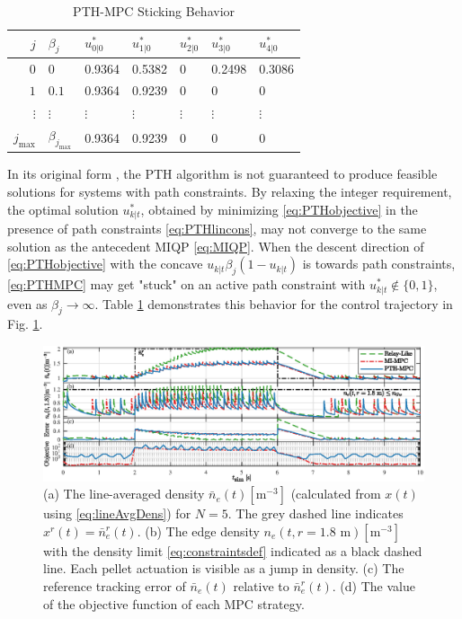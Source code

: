 \documentclass[journal,twoside,web]{ieeecolor}
\begin{document}
\begin{table}[b!]
\caption{PTH-MPC Sticking Behavior}
\centering
\begin{tabular}{rllllll}
\toprule[1pt]
$ j $ & $\beta_j$  & $u^*_{0|0}$ & $u^*_{1|0}$ & $u^*_{2|0}$ & $u^*_{3|0}$ & $u^*_{4|0}$ \\  \midrule
 0 & 0 & 0.9364 & 0.5382 & 0 & 0.2498 & 0.3086 \\
 $1$ & $0.1$ & 0.9364 & 0.9239 & 0 & 0 & 0 \\
 $\vdots$ & $\vdots$ & $\vdots$ & $\vdots$ & $\vdots$ &  $\vdots$ & $\vdots$ \\
 $j_{\textrm{max}}$ & $\beta_{j_\textrm{max}}$ & 0.9364 & 0.9239 & 0 & 0 & 0 \\
\bottomrule
\end{tabular}
\label{tab:sticky}
\end{table}

In its original form \cite{Sager2006}, the PTH algorithm is not guaranteed to produce feasible solutions for systems with path constraints. By relaxing the integer requirement, the optimal solution $u^*_{k|t}$, obtained by minimizing \eqref{eq:PTHobjective} in the presence of path constraints \eqref{eq:PTHlincons}, may not converge to the same solution as the antecedent MIQP \eqref{eq:MIQP}. When the descent direction of \eqref{eq:PTHobjective} with the concave $u_{k|t}\beta_j(1-u_{k|t})$ is towards path constraints, \eqref{eq:PTHMPC} may get "stuck" on an active path constraint with $u^*_{k|t} \notin \{0,1\}$, even as $\beta_j\rightarrow \infty$. Table \ref{tab:sticky} demonstrates this behavior for the control trajectory in Fig. \ref{fig:ctrlTrajectory}.

\begin{figure}[t!]
\centering
\parbox{\textwidth}{\includegraphics[width=\textwidth]{orric3.eps}}
\caption{(a) The line-averaged density $\bar{n}_e(t)[\textrm{m}^{-3}]$ (calculated from $x(t)$ using \eqref{eq:lineAvgDens}) for $N=5$. The grey dashed line indicates $x^r(t) = \bar{n}_e^r(t)$. (b) The edge density $n_e(t, r=1.8\textrm{ m})[\textrm{m}^{-3}]$ with the density limit \eqref{eq:constraintsdef} indicated as a black dashed line. Each pellet actuation is visible as a jump in density. (c) The reference tracking error of $\bar{n}_{e}(t)$ relative to $\bar{n}_e^r(t)$. (d) The value of the objective function of each MPC strategy.}
\label{fig:ctrlTrajectory}
\end{figure}
\end{document}
